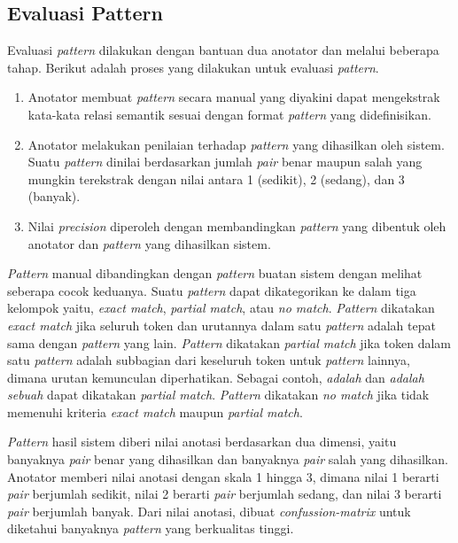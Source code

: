 \subsection{Evaluasi Pattern}
Evaluasi \textit{pattern} dilakukan dengan bantuan dua anotator dan melalui beberapa tahap. Berikut adalah proses yang dilakukan untuk evaluasi \textit{pattern}.
\begin{enumerate}
  \item Anotator membuat \textit{pattern} secara manual yang diyakini dapat mengekstrak kata-kata relasi semantik sesuai dengan format \textit{pattern} yang didefinisikan.
  \item Anotator melakukan penilaian terhadap \textit{pattern} yang dihasilkan oleh sistem. Suatu \textit{pattern} dinilai berdasarkan jumlah \textit{pair} benar maupun salah yang mungkin terekstrak dengan nilai antara 1 (sedikit), 2 (sedang), dan 3 (banyak).
  \item Nilai \textit{precision} diperoleh dengan membandingkan \textit{pattern} yang dibentuk oleh anotator dan \textit{pattern} yang dihasilkan sistem.
\end{enumerate}

\textit{Pattern} manual dibandingkan dengan \textit{pattern} buatan sistem dengan melihat seberapa cocok keduanya. Suatu \textit{pattern} dapat dikategorikan ke dalam tiga kelompok yaitu, \textit{exact match}, \textit{partial match}, atau \textit{no match}. \textit{Pattern} dikatakan \textit{exact match} jika seluruh token dan urutannya dalam satu \textit{pattern} adalah tepat sama dengan \textit{pattern} yang lain. \textit{Pattern} dikatakan \textit{partial match} jika token dalam satu \textit{pattern} adalah subbagian dari keseluruh token untuk \textit{pattern} lainnya, dimana urutan kemunculan diperhatikan. Sebagai contoh, \textit{{\tagHypernym} adalah {\tagHyponym}} dan \textit{{\tagHypernym} adalah sebuah {\tagHyponym}} dapat dikatakan \textit{partial match}. \textit{Pattern} dikatakan \textit{no match} jika tidak memenuhi kriteria \textit{exact match} maupun \textit{partial match}.

\textit{Pattern} hasil sistem diberi nilai anotasi berdasarkan dua dimensi, yaitu banyaknya \textit{pair} benar yang dihasilkan dan banyaknya \textit{pair} salah yang dihasilkan. Anotator memberi nilai anotasi dengan skala 1 hingga 3, dimana nilai 1 berarti \textit{pair} berjumlah sedikit, nilai 2 berarti \textit{pair} berjumlah sedang, dan nilai 3 berarti \textit{pair} berjumlah banyak. Dari nilai anotasi, dibuat \textit{confussion-matrix} untuk diketahui banyaknya \textit{pattern} yang berkualitas tinggi. 

